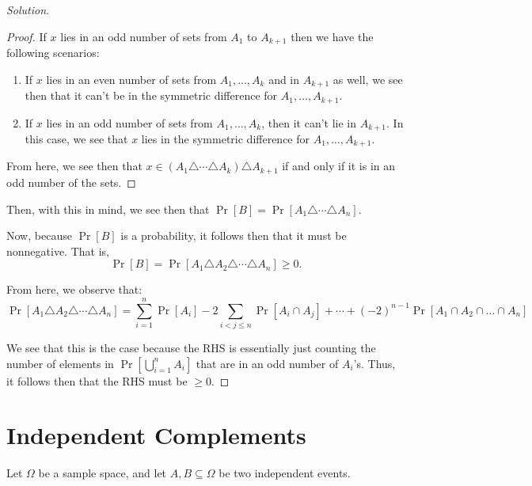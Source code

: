 \documentclass{article}
\newenvironment{solution}{\begin{proof}[Solution]}{\end{proof}}
\let\oldsum\sum
\renewcommand{\sum}[2]{\oldsum\limits_{#1}^{#2}}
\begin{document}
\begin{solution}
\begin{proof}
	If $x$ lies in an odd number of sets from $A_{1}$ to $A_{k+1}$ then we have the following scenarios:
	\begin{enumerate}
		\item If $x$ lies in an even number of sets from $A_{1}, \ldots, A_{k}$ and in $A_{k+1}$ as well, we see then that it can't be in the symmetric difference for $A_{1}, \ldots, A_{k+1}$.
		
		\item If $x$ lies in an odd number of sets from $A_{1}, \ldots, A_{k}$, then it can't lie in $A_{k+1}$. In this case, we see that $x$ lies in the symmetric difference for $A_{1}, \ldots, A_{k+1}$.
	\end{enumerate}
	
	From here, we see then that $x \in (A_{1} \triangle \cdots \triangle A_{k}) \triangle A_{k+1}$ if and only if it is in an odd number of the sets.
\end{proof}

Then, with this in mind, we see then that $\Pr[B] = \Pr[A_{1} \triangle \cdots \triangle A_{n}]$.

Now, because $\Pr[B]$ is a probability, it follows then that it must be nonnegative. That is, 
	\begin{equation*}
		\Pr[B] = \Pr[A_{1} \triangle A_{2} \triangle \cdots \triangle A_{n}] \geq 0.
	\end{equation*}
	
	From here, we observe that:
	\begin{equation*}
		\Pr[A_{1} \triangle A_{2} \triangle \cdots \triangle A_{n}] = \sum{i=1}{n} \Pr\left[A_i\right]
		- 2\sum{i<j\leq n}{} \Pr\left[A_i \cap A_j\right]
		+ \cdots
		+ (-2)^{n-1} \Pr\left[A_1 \cap A_2 \cap \dots \cap A_n\right]
	\end{equation*}

	We see that this is the case because the RHS is essentially just counting the number of elements in $\Pr\left[ \bigcup_{i=1}^{n} A_{i} \right]$ that are in an odd number of $A_{i}$'s. Thus, it follows then that the RHS must be $\geq 0$.
\end{solution}

\newpage

\section{Independent Complements}
Let $\Omega$ be a sample space, and let $A,B \subseteq \Omega$ be two independent events.
\end{document}

